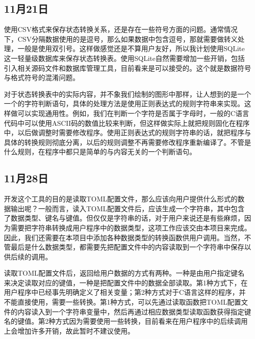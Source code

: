 \subsection{11月21日}
使用CSV格式来保存状态转换关系，还是存在一些符号方面的问题。通常情况下，CSV分隔数据使用的是逗号，那么如果数据中包含逗号，那就需要做转义处理，一般是使用双引号。这样做感觉还是不算用户友好，所以我计划使用SQLite这一轻量级数据库来保存状态转换表。使用SQLite自然需要增加一些开销，包括引入相关源码文件和数据库管理工具，目前看来是可以接受的。这个就是数据符号与格式符号的混淆问题。

对于状态转换表中的实际内容，并不象我们绘制的图形中那样，让人想到的是一个一个的字符判断语句，具体的处理方法是使用正则表达式的规则字符串来实现。这样做可以实现通用性。例如，我们在判断一个字符是否属于字母时，一般的C语言代码中可以使用ASCII码的数值比较来判断，但这样做实际上就把规则固化在程序中，以后做调整时需要修改程序。使用正则表达式的规则字符串的话，就把程序与具体的转换规则彻底分离，以后的规则调整不再需要修改程序重新编译了。不管是什么规则，在程序中都只是简单的与内容无关的一个判断语句。


\subsection{11月28日}
开发这个工具的目的是读取TOML配置文件，那么应该向用户提供什么形式的数据输出呢？一般而言，读入TOML配置文件后，应该生成一个字符串，其中包含了数据类型、键名与键值。但仅仅是字符串的话，对于用户来说还是有些麻烦，因为需要把字符串转换成用户程序中的数据类型，这项工作应该交由本项目来完成。因此，我们还需要在本项目中添加各种数据类型的转换函数供用户调用。当然，不管最后是什么数据类型，都需要先把配置文件中的内容读取到一个字符串中保存以供后续的调用。

读取TOML配置文件后，返回给用户数据的方式有两种。一种是由用户指定键名来决定读取对应的键值，一种是把配置文件中的数据全部读取。第1种方式下，在用户程序中已经事先明确定义了相关变量；第2种方式对于C语言这样的程序，并不能直接使用，需要一些转换。第1种方式，可以先通过读取函数把TOML配置文件的内容读入到一个字符串变量中，然后再通过相应数据类型读取函数获得指定键名的键值。第2种方式因为需要使用一些转换，目前看来在用户程序中的后续调用上会增加许多开销，故此暂时不建议使用。